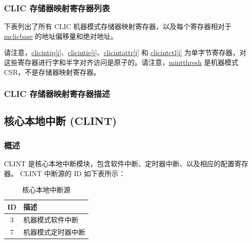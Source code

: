 \documentclass[main\_\_CN.tex]{subfiles}
\begin{document}

\hypertarget{riscvcpu-clic-memmap-reg-summ}{}
\subsubsection{CLIC 存储器映射寄存器列表}
\label{sec:riscvcpu-clic-memmap-reg-summ}

下表列出了所有 CLIC 机器模式存储器映射寄存器，以及每个寄存器相对于 \hyperref[fielddesc:MCLICBASE]{mclicbase} 的地址偏移量和绝对地址。

请注意，\hyperref[regdesc:MCLICINTIP_REG_i]{clicintip[i]}、\hyperref[regdesc:MCLICINTIE_REG_i]{clicintie[i]}、\hyperref[regdesc:MCLICINTATTR_REG_i]{clicintattr[i]} 和 \hyperref[regdesc:MCLICINTCTL_REG_i]{clicintctl[i]} 为单字节寄存器，对这些寄存器进行字和半字对齐访问是原子的。请注意，\hyperref[regdesc:MINTTHRESH]{mintthresh} 是机器模式 CSR，不是存储器映射寄存器。





\hypertarget{riscvcpu-clic-memmap-reg}{}
\subsubsection{CLIC 存储器映射寄存器描述}
\label{sec:riscvcpu-clic-memmap-reg}



\newpage
\subsection{核心本地中断 (CLINT)}
\label{sec:riscvcpu-clint}
\subsubsection{概述}
\label{sec:riscvcpu-clint-overview}
CLINT 是核心本地中断模块，包含软件中断、定时器中断、以及相应的配置寄存器。
CLINT 中断源的 ID 如下表所示：

\begin{longtable}{ | c | l | }
\caption{核心本地中断源} \label{tab:riscvcpu-clint-table}
\\ \hline
\rowcolor{lightgray}
ID & 描述 \\ \hline
3 & 机器模式软件中断 \\ \hline
7 & 机器模式定时器中断 \\ \hline
\end{longtable}
\end{document}

